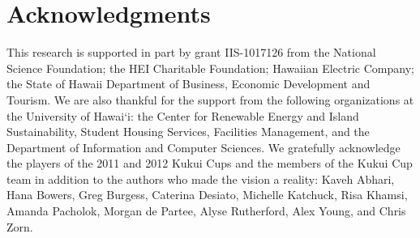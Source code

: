 \documentclass{ict4s_proc_article}
\begin{document}












\section{Acknowledgments}

This research is supported in part by grant IIS-1017126 from the National
Science Foundation; the HEI Charitable Foundation; Hawaiian Electric Company; the State of Hawaii Department of Business, Economic Development and Tourism. We are also thankful for the support from the following organizations at the University of Hawai`i: the Center for Renewable Energy and Island Sustainability, Student Housing Services, Facilities Management, and the Department of Information and Computer Sciences. We gratefully acknowledge the players of the 2011 and 2012 Kukui Cups and the members of the Kukui Cup team in addition to the authors who made the vision a reality: Kaveh Abhari, Hana Bowers, Greg Burgess, Caterina Desiato, Michelle Kat\-chuck, Risa Khamsi, Amanda Pacholok, Morgan de Partee, Alyse Rutherford, Alex Young, and Chris Zorn.



\balancecolumns
\end{document}
